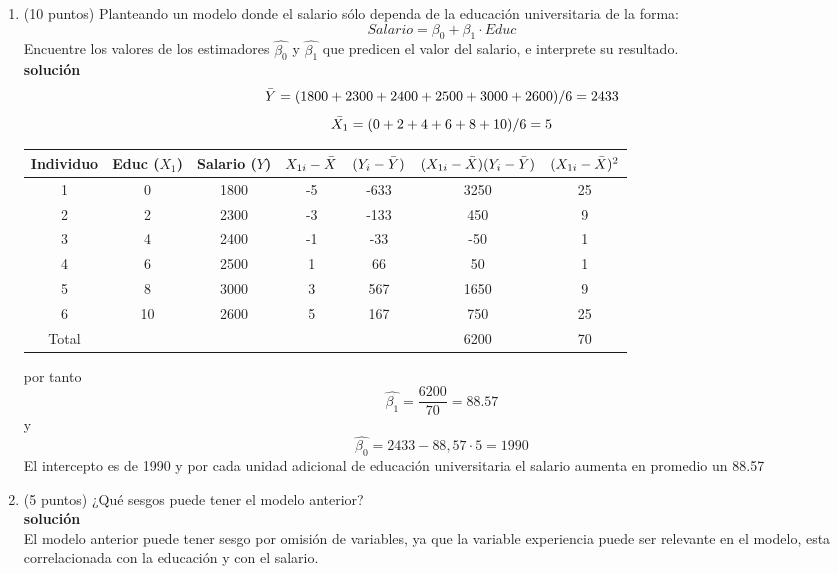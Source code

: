 \documentclass[10pt,a4paper]{article}
\begin{document}
\begin{enumerate}
\begin{enumerate}
    \item (10 puntos) Planteando un modelo donde el salario sólo dependa de la educación universitaria de la forma:
    $$Salario = \beta_0 + \beta_1 \cdot Educ$$
    Encuentre los valores de los estimadores $\hat{\beta_0}$ y $\hat{\beta_1}$ que predicen el valor del salario, e interprete su resultado.
    \\
    \textbf{solución}
    \\
    $$\Bar{Y}=(1800+2300+2400+2500+3000+2600)/6 = 2433$$
    $$\Bar{X_1} = (0+2+4+6+8+10)/6 = 5$$
\begin{center}
\begin{tabular}{|c|c|c|c|c|c|c|}
\hline
\textbf{Individuo} & \textbf{Educ} ($X_1$)  & \textbf{Salario ($Y$)} & $X_{1i}-\Bar{X}$ & $(Y_i - \Bar{Y})$ & $(X_{1i}-\Bar{X})(Y_i - \Bar{Y})$ & $(X_{1i}-\Bar{X})^2$\\
\hline
1 & 0 & 1800  & -5 & -633  & 3250 & 25  \\
2 & 2 & 2300  & -3 & -133 & 450  & 9  \\
3 & 4 & 2400  & -1 & -33  & -50  & 1 \\
4 & 6 & 2500  & 1  & 66   & 50   & 1  \\
5 & 8 & 3000  & 3  & 567   & 1650  & 9  \\
6 & 10 & 2600 & 5  & 167  & 750  & 25  \\
\hline
Total & & & & & 6200  & 70 \\
\end{tabular}
\end{center}
por tanto 
$$\hat{\beta_1} = \frac{6200}{70}= 88.57$$
y
$$\hat{\beta_0} = 2433-88,57\cdot 5 = 1990$$
El intercepto es de 1990 y por cada unidad adicional de educación universitaria el salario aumenta en promedio un 88.57

    \item (5 puntos) ¿Qué sesgos puede tener el modelo anterior?
    \\
    \textbf{solución}
    \\
    El modelo anterior puede tener sesgo por omisión de variables, ya que la variable experiencia puede ser relevante en el modelo, esta correlacionada con la educación y con el salario.
    \\


\end{enumerate}
\end{enumerate}
\end{document}
